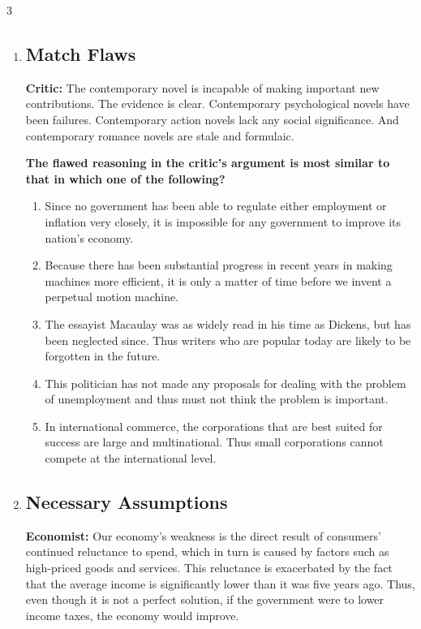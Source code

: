 \documentclass[9pt]{article}
\begin{document}
\begin{multicols}{3}
\begin{enumerate}
\item
\subsection*{Match Flaws}

\noindent
\textbf{Critic:} The contemporary novel is incapable of making important new contributions. The evidence is clear. Contemporary psychological novels have been failures. Contemporary action novels lack any social significance. And contemporary romance novels are stale and formulaic.

 

\noindent
\textbf{The flawed reasoning in the critic's argument is most similar to that in which one of the following?}

\begin{enumerate}[label=(\alph*)]
    \item Since no government has been able to regulate either employment or inflation very closely, it is impossible for any government to improve its nation's economy.
    \item Because there has been substantial progress in recent years in making machines more efficient, it is only a matter of time before we invent a perpetual motion machine.
    \item The essayist Macaulay was as widely read in his time as Dickens, but has been neglected since. Thus writers who are popular today are likely to be forgotten in the future.
    \item This politician has not made any proposals for dealing with the problem of unemployment and thus must not think the problem is important.
    \item In international commerce, the corporations that are best suited for success are large and multinational. Thus small corporations cannot compete at the international level.
\end{enumerate}


\item 
\subsection*{Necessary Assumptions}

\noindent
\textbf{Economist:} Our economy's weakness is the direct result of consumers' continued reluctance to spend, which in turn is caused by factors such as high-priced goods and services. This reluctance is exacerbated by the fact that the average income is significantly lower than it was five years ago. Thus, even though it is not a perfect solution, if the government were to lower income taxes, the economy would improve.


\end{enumerate}
\end{multicols}
\end{document}
